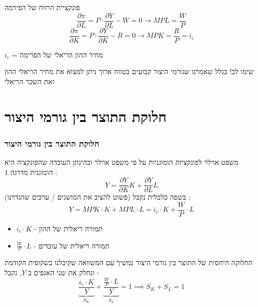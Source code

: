 \documentclass[usenames,dvipsnames]{beamer}
\begin{document}
\begin{RTL}
\begin{frame}[allowframebreaks]
\begin{block}{פונקציית הרווח של הפירמה}
            $$\frac{\partial \pi}{\partial L } = P \cdot \frac{\partial Y}{\partial L} - W = 0 \to MPL = \frac{W}{P}$$
            $$\frac{\partial \pi}{\partial K} = P \cdot \frac{\partial Y}{\partial K} - R = 0 \to MPK = \frac{R}{P} = i_c$$

            $i_c$ = מחיר ההון הריאלי של הפרימה
        \end{block}

        \framebreak

        \begin{alertblock}{שימו לב!}
            בגלל שאמרנו שגורמי היצור קבועים בטווח ארוך ניתן למצוא את מחיר הריאלי ההון ואת השכר הריאלי
        \end{alertblock}
        
    
    \end{frame}

    \section{חלוקת התוצר בין גורמי היצור}
    \begin{frame}[allowframebreaks]
        \frametitle{חלוקת התוצר בין גורמי היצור}
        \begin{block}{משפט אוילר לפונקציות הומוגניות}
            על פי משפט אוילר ובהינתן העובדה שהפונקציה היא הומוגנית מדרגה 1 :
            \begin{equation*}
                Y  = \frac{\partial Y}{\partial K} K + \frac{\partial Y}{\partial L} L
            \end{equation*} 
            בשפה כלכלית נקבל (פשוט להציב את המושגים / ערכים שהגדרנו) : 
            \begin{equation*}
                Y = MPK \cdot  K + MPL \cdot  L = i_c \cdot K + \frac{W}{P} \cdot L
            \end{equation*}
            \begin{itemize}
                \item $i_c \cdot K$ - תמורה ריאלית של ההון
                \item $\frac{W}{P} \cdot L$ - תמורה ריאלית של עובדים
            \end{itemize}
        \end{block}
        

        \framebreak
        \begin{block}{החלוקה היחסית של התוצר בין גורמי היצור}
            נמשיך עם המשוואה שקיבלנו בשקופית הקודמת ונחלק את שני האגפים ב $Y$, נקבל : 
            \begin{equation*}
               \underbrace{ \frac{i_c \cdot K}{Y}}_{S_K} + \underbrace{\frac{\frac{W}{P} \cdot L}{Y}}_{S_L} = 1 \implies S_K + S_L = 1 
            \end{equation*}


\end{block}
\end{frame}
\end{RTL}
\end{document}
